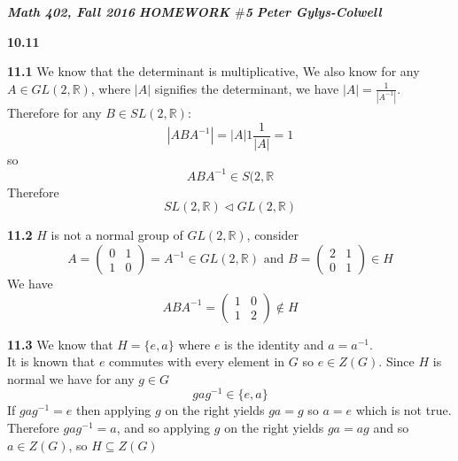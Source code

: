 \documentclass[12pt]{article}
\newenvironment{ques}{\vspace{2 ex}}{\vspace{2 ex}}
\theoremstyle{definition}
\begin{document}
\noindent \textit{\textbf{Math 402, Fall 2016}} \hspace{1.3cm}
\textit{\textbf{HOMEWORK $\#$5}} \hspace{1.3cm} \textit{\textbf{Peter
Gylys-Colwell}} 

\vspace{1cm}

\begin{ques}
	\textbf{10.11} 
\end{ques}

\begin{ques}
	\textbf{11.1}
		We know that the determinant is multiplicative, We also know
		for any $A \in GL(2,\mathbb{R})$, where $|A|$ signifies the
		determinant, we have $|A| = \frac{1}{|A^{-1}|}$.\\
		Therefore for any $B \in SL(2, \mathbb{R})$:
		$$|ABA^{-1}| = |A|1\frac{1}{|A|} = 1$$
		so
		$$ABA^{-1} \in S(2,\mathbb{R}$$
		Therefore
		$$SL(2,\mathbb{R}) \triangleleft GL(2, \mathbb{R})$$
\end{ques}

\begin{ques}
	\textbf{11.2}
		$H$ is not a normal group of $GL(2,\mathbb{R})$, consider
		$$A =\left (\begin{array}{cc}
			0 & 1\\
			1 & 0
		\end{array}\right) = A^{-1} \in GL(2,\mathbb{R}) \text{ and } 
		B = \left (\begin{array}{cc}
			2 & 1\\
			0 & 1 
		\end{array}\right) \in H$$
		We have
		$$ABA^{-1} = \left(\begin{array}{cc}
			1 & 0\\
			1 & 2
		\end{array}\right) \notin H$$
\end{ques}

\begin{ques}
	\textbf{11.3}
		We know that $H = \{e, a\}$ where $e$ is the identity and $a = a^{-1}$.\\
		It is known that $e$ commutes with every element in $G$ so $e \in Z(G)$. Since
		$H$ is normal we have
		for any $g \in G$
		$$gag^{-1} \in \{e, a\}$$
		If $gag^{-1} = e$ then applying $g$ on the right yields $ga = g$
		so $a = e$ which is not true.  Therefore $gag^{-1} = a$, and so
		applying $g$ on the right yields $ga = ag$ and so $a \in Z(G)$,
		so $H \subseteq Z(G)$
\end{ques}
\end{document}
